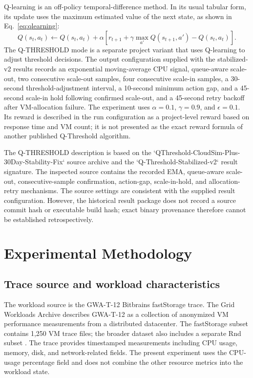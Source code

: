 \documentclass[pdflatex,sn-mathphys-num]{sn-jnl}
\begin{document}
Q-learning is an off-policy temporal-difference method. In its usual tabular form, its update uses the maximum estimated value of the next state, as shown in Eq.~\ref{eq:qlearning}:
\begin{equation}
Q(s_t,a_t)\leftarrow Q(s_t,a_t)+\alpha\left[r_{t+1}+\gamma\max_{a'}Q(s_{t+1},a')-Q(s_t,a_t)\right].
\label{eq:qlearning}
\end{equation}
The Q-THRESHOLD mode is a separate project variant that uses Q-learning to adjust threshold decisions. The output configuration supplied with the stabilized-v2 results records an exponential moving-average CPU signal, queue-aware scale-out, two consecutive scale-out samples, four consecutive scale-in samples, a 30-second threshold-adjustment interval, a 10-second minimum action gap, and a 45-second scale-in hold following confirmed scale-out, and a 45-second retry backoff after VM-allocation failure. The experiment uses $\alpha=0.1$, $\gamma=0.9$, and $\epsilon=0.1$. Its reward is described in the run configuration as a project-level reward based on response time and VM count; it is not presented as the exact reward formula of another published Q-Threshold algorithm.

The Q-THRESHOLD description is based on the `QThreshold-CloudSim-Plus-30Day-Stability-Fix` source archive and the `Q-Threshold-Stabilized-v2` result signature. The inspected source contains the recorded EMA, queue-aware scale-out, consecutive-sample confirmation, action-gap, scale-in-hold, and allocation-retry mechanisms. The source settings are consistent with the supplied result configuration. However, the historical result package does not record a source commit hash or executable build hash; exact binary provenance therefore cannot be established retrospectively.

\section{Experimental Methodology}\label{sec:method}

\subsection{Trace source and workload characteristics}

The workload source is the GWA-T-12 Bitbrains fastStorage trace. The Grid Workloads Archive describes GWA-T-12 as a collection of anonymized VM performance measurements from a distributed datacenter. The fastStorage subset contains 1,250 VM trace files; the broader dataset also includes a separate Rnd subset \cite{shen2015bitbrains}. The trace provides timestamped measurements including CPU usage, memory, disk, and network-related fields. The present experiment uses the CPU-usage percentage field and does not combine the other resource metrics into the workload state.
\end{document}
